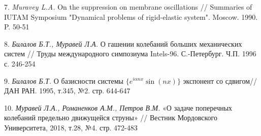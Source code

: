 7. {\it Muravey L.A.} On the suppression on membrane oscillations // Summaries of IUTAM Symposium "Dynamical problems of rigid-elastic system". Moscow. 1990. P. 50-51

8. {\it Билалов Б.Т., Муравей Л.А.} О гашении колебаний больших механических систем // Труды международного симпозиума Intels-96. С.-Петербург. Ч.П. 1996 с. 246-254

9. {\it Билалов Б.Т.} О базисности системы $\{e^{i\alpha nx}\sin(nx)\}$ экспонент со сдвигом// ДАН РАН. 1995, т.345, №2. стр. 644-647

10. {\it Муравей Л.А., Романенков А.М., Петров В.М.} «О задаче поперечных колебаний предельно движущейся струны» // Вестник Мордовского Университета, 2018, т.28, №4. стр. 472-483
